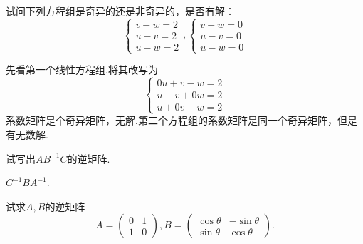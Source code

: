 ﻿\documentclass{book} \usepackage{exsheets} \usepackage{xeCJK}
\begin{document}
\begin{question}
  试问下列方程组是奇异的还是非奇异的，是否有解：
$$
  \begin{cases}
    v-w=2\\
    u-v=2\\
    u-w=2
  \end{cases},
  \begin{cases}
    v-w=0\\
    u-v=0\\
    u-w=0
  \end{cases}
$$
\end{question}
\begin{solution}
  先看第一个线性方程组.将其改写为
$$
\begin{cases}
  0u+v-w=2\\
  u-v+0w=2\\
  u+0v-w=2
\end{cases}
$$
系数矩阵是个奇异矩阵，无解.第二个方程组的系数矩阵是同一个奇异矩阵，但是
有无数解.
\end{solution}
\begin{question}
  试写出$AB^{-1}C$的逆矩阵.
\end{question}
\begin{solution}
  $C^{-1}BA^{-1}$.
\end{solution}
\begin{question}
  试求$A,B$的逆矩阵
$$
A=
\begin{pmatrix}
  0&1\\
  1&0
\end{pmatrix},B=
\begin{pmatrix}
  \cos\theta&-\sin\theta\\
  \sin\theta&\cos\theta
\end{pmatrix}.
$$
\end{question}
\end{document}
